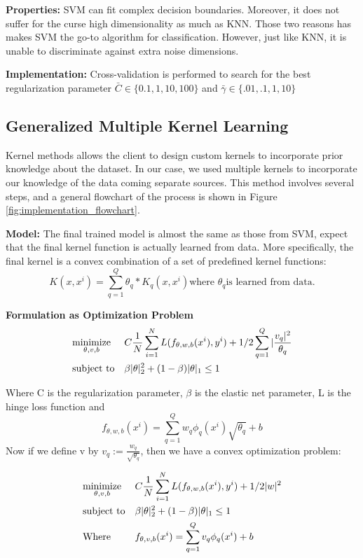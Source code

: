 \documentclass{article}
\begin{document}
\textbf{Properties:}
SVM can fit complex decision boundaries. Moreover, it does not suffer for the curse high dimensionality as much as KNN. Those two reasons has makes SVM the go-to algorithm for classification. However, just like KNN, it is unable to discriminate against extra noise dimensions.

\textbf{Implementation:}
Cross-validation is performed to search for the best regularization parameter $\bar{C} \in \{0.1, 1, 10, 100\}$ and $\bar{\gamma} \in \{.01, .1, 1, 10\}$




\subsection*{Generalized Multiple Kernel Learning}
Kernel methods allows the client to design custom kernels to incorporate prior knowledge about the dataset. In our case, we used multiple kernels to incorporate our knowledge of the data coming separate sources. This method involves several steps, and a general flowchart of the process is shown in Figure \ref{fig:implementation_flowchart}.

\textbf{Model:}
The final trained model is almost the same as those from SVM, expect that the final kernel function is actually learned from data. More specifically, the final kernel is a convex combination of a set of predefined kernel functions: $$K(x, x^i) = \sum_{q=1}^{Q} \theta_q * K_q(x, x^i) \text{where }\theta_q \text{is learned from data}.$$

\textbf{Formulation as Optimization Problem}
\begin{align*}
&\text{$\underset{\theta, v, b}{\text{minimize}}$} & &C  \frac{1}{N} \sum_{i=1}^{N} L(f_{\theta, w, b}(x^i), y^i) + 1/2 \sum_{q=1}^{Q}|\frac{v_q|^2}{\theta_q} \\
&\text{subject to} & &\beta|\theta|_2^2 + (1-\beta){|\theta|_1} \leq 1
\end{align*}


Where C is the regularization parameter, $\beta$ is the elastic net parameter, L is the hinge loss function and $$f_{\theta, w, b}(x^i) = \sum_{q=1}^{Q} w_q \phi_q(x^i) \sqrt{\theta_q} + b $$
Now if we define v by $v_q := \frac{w_q}{\sqrt{\theta_q}}$, then we have a convex optimization problem:

\begin{align*}
&\text{$\underset{\theta, v, b}{\text{minimize}}$} & &C  \frac{1}{N} \sum_{i=1}^{N} L(f_{\theta, w, b}(x^i), y^i) + 1/2 |w|^2 \\
&\text{subject to} & &\beta|\theta|_2^2 + (1-\beta){|\theta|_1} \leq 1 \\
&\text{Where}  & &f_{\theta, v, b}(x^i) = \sum_{q=1}^{Q} v_q \phi_q(x^i)  + b
\end{align*}
\end{document}
